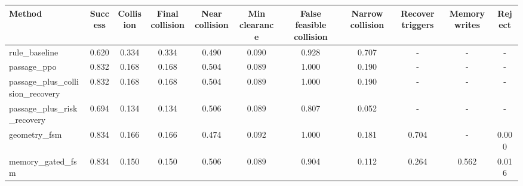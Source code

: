 \begin{tabular}{lcccccccccc}
\toprule
Method & Success & Collision & Final collision & Near collision & Min clearance & False feasible collision & Narrow collision & Recover triggers & Memory writes & Reject \\
\midrule
rule_baseline & 0.620 & 0.334 & 0.334 & 0.490 & 0.090 & 0.928 & 0.707 & - & - & - \\
passage_ppo & 0.832 & 0.168 & 0.168 & 0.504 & 0.089 & 1.000 & 0.190 & - & - & - \\
passage_plus_collision_recovery & 0.832 & 0.168 & 0.168 & 0.504 & 0.089 & 1.000 & 0.190 & - & - & - \\
passage_plus_risk_recovery & 0.694 & 0.134 & 0.134 & 0.506 & 0.089 & 0.807 & 0.052 & - & - & - \\
geometry_fsm & 0.834 & 0.166 & 0.166 & 0.474 & 0.092 & 1.000 & 0.181 & 0.704 & - & 0.000 \\
memory_gated_fsm & 0.834 & 0.150 & 0.150 & 0.506 & 0.089 & 0.904 & 0.112 & 0.264 & 0.562 & 0.016 \\
\bottomrule
\end{tabular}
